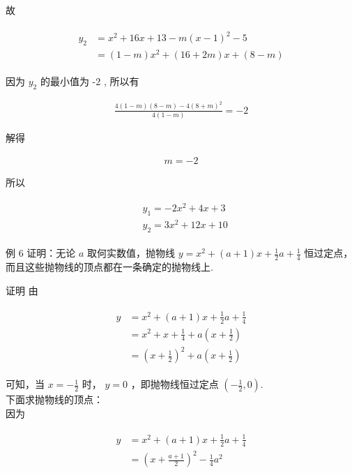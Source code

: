 \documentclass[10pt]{article}
\begin{document}
故

\begin{align*}
\begin{aligned}
y_{2} & =x^{2}+16 x+13-m(x-1)^{2}-5 \\
& =(1-m) x^{2}+(16+2 m) x+(8-m)
\end{aligned}
\end{align*}

因为 $y_{2}$ 的最小值为 -2 , 所以有

\begin{align*}
\frac{4(1-m)(8-m)-4(8+m)^{2}}{4(1-m)}=-2
\end{align*}

解得

\begin{align*}
m=-2
\end{align*}

所以

\begin{align*}
\begin{aligned}
& y_{1}=-2 x^{2}+4 x+3 \\
& y_{2}=3 x^{2}+12 x+10
\end{aligned}
\end{align*}

例 6 证明：无论 $a$ 取何实数值，抛物线 $y=x^{2}+(a+1) x+\frac{1}{2} a+\frac{1}{4}$ 恒过定点，而且这些抛物线的顶点都在一条确定的抛物线上.

证明 由

\begin{align*}
\begin{aligned}
y & =x^{2}+(a+1) x+\frac{1}{2} a+\frac{1}{4} \\
& =x^{2}+x+\frac{1}{4}+a\left(x+\frac{1}{2}\right) \\
& =\left(x+\frac{1}{2}\right)^{2}+a\left(x+\frac{1}{2}\right)
\end{aligned}
\end{align*}

可知，当 $x=-\frac{1}{2}$ 时， $y=0$ ，即抛物线恒过定点 $\left(-\frac{1}{2}, 0\right)$.\\
下面求抛物线的顶点：\\
因为

\begin{align*}
\begin{aligned}
y & =x^{2}+(a+1) x+\frac{1}{2} a+\frac{1}{4} \\
& =\left(x+\frac{a+1}{2}\right)^{2}-\frac{1}{4} a^{2}
\end{aligned}
\end{align*}
\end{document}
